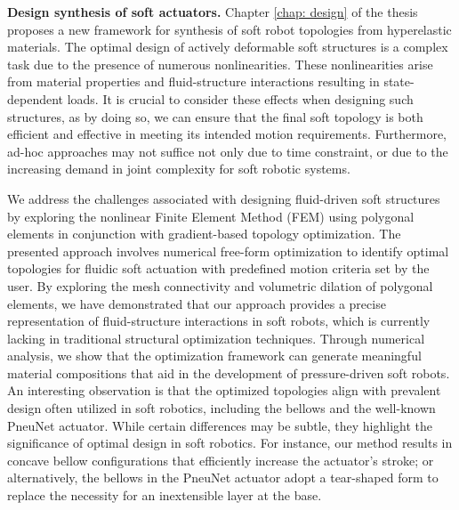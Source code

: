 

\textbf{Design synthesis of soft actuators. } Chapter \ref{chap: design} of the thesis proposes a new framework for synthesis of soft robot topologies from hyperelastic materials. The optimal design of actively deformable soft structures is a complex task due to the presence of numerous nonlinearities. These nonlinearities arise from material properties and fluid-structure interactions resulting in state-dependent loads. It is crucial to consider these effects when designing such structures, as by doing so, we can ensure that the final soft topology is both efficient and effective in meeting its intended motion requirements. Furthermore, ad-hoc approaches may not suffice not only due to time constraint, or due to the increasing demand in joint complexity for soft robotic systems.

We address the challenges associated with designing fluid-driven soft structures by exploring the nonlinear Finite Element Method (FEM) using polygonal elements in conjunction with gradient-based topology optimization. The presented approach involves numerical free-form optimization to identify optimal topologies for fluidic soft actuation with predefined motion criteria set by the user. By exploring the mesh connectivity and volumetric dilation of polygonal elements, we have demonstrated that our approach provides a precise representation of fluid-structure interactions in soft robots, which is currently lacking in traditional structural optimization techniques. Through numerical analysis, we show that the optimization framework can generate meaningful material compositions that aid in the development of pressure-driven soft robots. An interesting observation is that the optimized topologies align with prevalent design often utilized in soft robotics, including the bellows and the well-known PneuNet actuator. While certain differences may be subtle, they highlight the significance of optimal design in soft robotics. For instance, our method results in concave bellow configurations that efficiently increase the actuator's stroke; or alternatively, the bellows in the PneuNet actuator adopt a tear-shaped form to replace the necessity for an inextensible layer at the base. 

